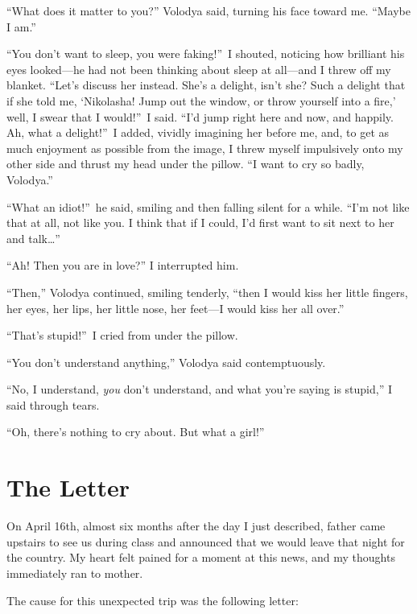 ``What does it matter to you?'' Volodya said, turning his face toward me. ``Maybe I am.'' %

``You don't want to sleep, you were faking!''~I shouted, noticing how brilliant his eyes looked---he had not been thinking about sleep at all---and I threw off my blanket. ``Let's discuss her instead. She's a delight, isn't she? Such a delight that if she told me, `Nikolasha! Jump out the window, or throw yourself into a fire,' well, I swear that I would!''~I said. ``I'd jump right here and now, and happily. Ah, what a delight!''~I added, vividly imagining her before me, and, to get as much enjoyment as possible from the image, I threw myself impulsively onto my other side and thrust my head under the pillow. ``I want to cry so badly, Volodya.'' %

``What an idiot!''~he said, smiling and then falling silent for a while. ``I'm not like that at all, not like you. I think that if I could, I'd first want to sit next to her and talk\ldots{}'' %

``Ah! Then you are in love?'' I interrupted him. %

``Then,'' Volodya continued, smiling tenderly, ``then I would kiss her little fingers, her eyes, her lips, her little nose, her feet---I would kiss her all over.'' %

``That's stupid!''~I cried from under the pillow. %

``You don't understand anything,'' Volodya said contemptuously. %

``No, I understand, \emph{you} don't understand, and what you're saying is stupid,'' I said through tears. %

``Oh, there's nothing to cry about. But what a girl!'' %

\chapter{The Letter} %

On April 16th, almost six months after the day I just described, father came upstairs to see us during class and announced that we would leave that night for the country. My heart felt pained for a moment at this news, and my thoughts immediately ran to mother.

The cause for this unexpected trip was the following letter:

